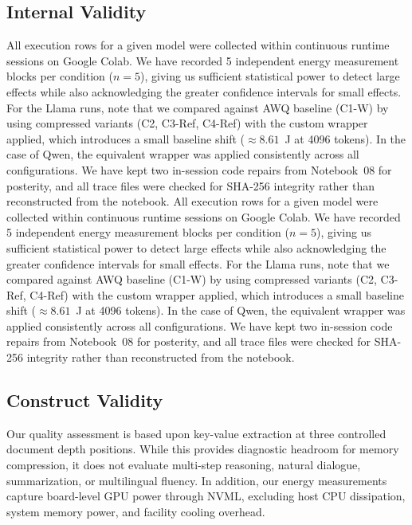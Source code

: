 \documentclass[sigconf,nonacm]{acmart}
\begin{document}
\begin{itemize}
\subsection{Internal Validity}
All execution rows for a given model were collected within continuous runtime sessions on Google Colab. We have recorded 5 independent energy measurement blocks per condition ($n=5$), giving us sufficient statistical power to detect large effects while also acknowledging the greater confidence intervals for small effects. For the Llama runs, note that we compared against AWQ baseline (C1-W) by using compressed variants (C2, C3-Ref, C4-Ref) with the custom wrapper applied, which introduces a small baseline shift ($\approx 8.61$~J at 4096 tokens). In the case of Qwen, the equivalent wrapper was applied consistently across all configurations. We have kept two in-session code repairs from Notebook~08 for posterity, and all trace files were checked for SHA-256 integrity rather than reconstructed from the notebook.
All execution rows for a given model were collected within continuous runtime sessions on Google Colab. We have recorded 5 independent energy measurement blocks per condition ($n=5$), giving us sufficient statistical power to detect large effects while also acknowledging the greater confidence intervals for small effects. For the Llama runs, note that we compared against AWQ baseline (C1-W) by using compressed variants (C2, C3-Ref, C4-Ref) with the custom wrapper applied, which introduces a small baseline shift ($\approx 8.61$~J at 4096 tokens). In the case of Qwen, the equivalent wrapper was applied consistently across all configurations. We have kept two in-session code repairs from Notebook~08 for posterity, and all trace files were checked for SHA-256 integrity rather than reconstructed from the notebook.

\subsection{Construct Validity}
Our quality assessment is based upon key-value extraction at three controlled document depth positions. While this provides diagnostic headroom for memory compression, it does not evaluate multi-step reasoning, natural dialogue, summarization, or multilingual fluency. In addition, our energy measurements capture board-level GPU power through NVML, excluding host CPU dissipation, system memory power, and facility cooling overhead.


\end{itemize}
\end{document}
